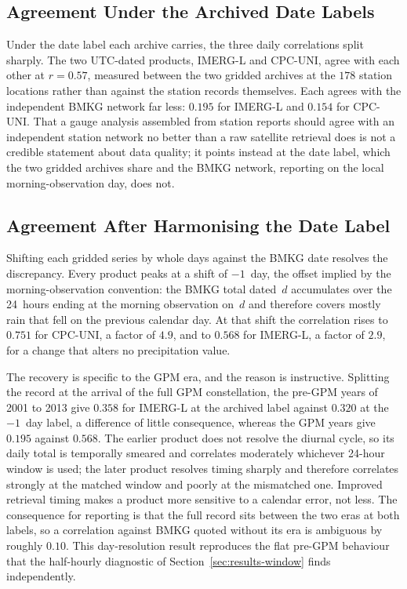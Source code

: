 \subsection{Agreement Under the Archived Date Labels}

Under the date label each archive carries, the three daily
correlations split sharply. The two UTC-dated products, IMERG-L and
CPC-UNI, agree with each other at $r = 0.57$, measured between the
two gridded archives at the $178$ station locations rather than
against the station records themselves. Each agrees with the
independent BMKG network far less: $0.195$ for IMERG-L and $0.154$
for CPC-UNI. That a gauge analysis assembled from station reports
should agree with an independent station network no better than a
raw satellite retrieval does is not a credible statement about data
quality; it points instead at the date label, which the two gridded
archives share and the BMKG network, reporting on the local
morning-observation day, does not.

\subsection{Agreement After Harmonising the Date Label}

Shifting each gridded series by whole days against the BMKG date
resolves the discrepancy. Every product peaks at a shift of
$-1$~day, the offset implied by the morning-observation convention:
the BMKG total dated~$d$ accumulates over the 24~hours ending at
the morning observation on~$d$ and therefore covers mostly rain
that fell on the previous calendar day. At that shift the
correlation rises to $0.751$ for CPC-UNI, a factor of $4.9$, and to
$0.568$ for IMERG-L, a factor of $2.9$, for a change that alters no
precipitation value.

The recovery is specific to the GPM era, and the reason is
instructive. Splitting the record at the arrival of the full GPM
constellation, the pre-GPM years of 2001 to 2013 give $0.358$ for
IMERG-L at the archived label against $0.320$ at the $-1$~day
label, a difference of little consequence, whereas the GPM years
give $0.195$ against $0.568$. The earlier product does not resolve
the diurnal cycle, so its daily total is temporally smeared and
correlates moderately whichever 24-hour window is used; the later
product resolves timing sharply and therefore correlates strongly
at the matched window and poorly at the mismatched one. Improved
retrieval timing makes a product more sensitive to a calendar
error, not less. The consequence for reporting is that the full
record sits between the two eras at both labels, so a correlation
against BMKG quoted without its era is ambiguous by roughly
$0.10$. This day-resolution result reproduces the flat pre-GPM
behaviour that the half-hourly diagnostic of
Section~\ref{sec:results-window} finds independently.

